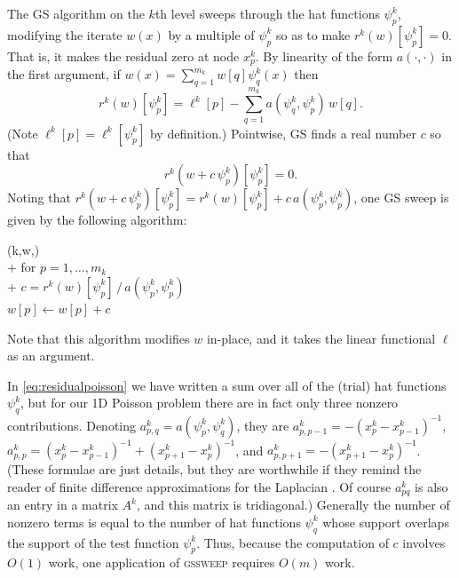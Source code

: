 \documentclass[letterpaper,final,12pt,reqno]{amsart}
\numberwithin{equation}{section}
\numberwithin{figure}{section}
\numberwithin{table}{section}
\begin{document}
The GS algorithm on the $k$th level sweeps through the hat functions $\psi_p^k$, modifying the iterate $w(x)$ by a multiple of $\psi_p^k$ so as to make $r^k(w)[\psi_p^k]=0$.  That is, it makes the residual zero at node $x_p^k$.  By linearity of the form $a(\cdot,\cdot)$ in the first argument, if $w(x) = \sum_{q=1}^{m_k} w[q] \psi_q^k(x)$ then
\begin{equation}
  r^k(w)[\psi_p^k] = \ell^k[p] - \sum_{q=1}^{m_k} a(\psi_q^k,\psi_p^k)\, w[q].  \label{eq:residualpoisson}
\end{equation}
(Note $\ell^k[p] = \ell^k[\psi_p^k]$ by definition.)  Pointwise, GS finds a real number $c$ so that
\begin{equation}
  r^k(w+c\,\psi_p^k)[\psi_p^k] = 0.  \label{eq:gaussseidelpoint}
\end{equation}
Noting that $r^k(w+c\,\psi_p^k)[\psi_p^k] = r^k(w)[\psi_p^k] + c\, a(\psi_p^k,\psi_p^k)$, one GS sweep is given by the following algorithm:
\begin{pseudo*}
(k,w,\ell)\text{:} \\+
    for $p=1,\dots,m_k$ \\+
        $\displaystyle c = r^k(w)[\psi_p^k]\, \big/ \,a(\psi_p^k,\psi_p^k)$  \qquad {} \\
        $w[p] \gets w[p] + c$
\end{pseudo*}
Note that this algorithm modifies $w$ in-place, and it takes the linear functional $\ell$ as an argument.

In \eqref{eq:residualpoisson} we have written a sum over all of the (trial) hat functions $\psi_q^k$, but for our 1D Poisson problem there are in fact only three nonzero contributions.  Denoting $a_{p,q}^k = a(\psi_p^k,\psi_q^k)$, they are $a_{p,p-1}^k = -(x_p^k-x_{p-1}^k)^{-1}$, $a_{p,p}^k = (x_p^k-x_{p-1}^k)^{-1} + (x_{p+1}^k-x_p^k)^{-1}$, and $a_{p,p+1}^k = -(x_{p+1}^k-x_p^k)^{-1}$.  (These formulae are just details, but they are worthwhile if they remind the reader of finite difference approximations for the Laplacian \cite[for example]{Bueler2021}.  Of course $a_{pq}^k$ is also an entry in a matrix $A^k$, and this matrix is tridiagonal.)  Generally the number of nonzero terms is equal to the number of hat functions $\psi_q^k$ whose support overlaps the support of the test function $\psi_p^k$.  Thus, because the computation of $c$ involves $O(1)$ work, one application of \textsc{gssweep} requires $O(m)$ work.
\end{document}
